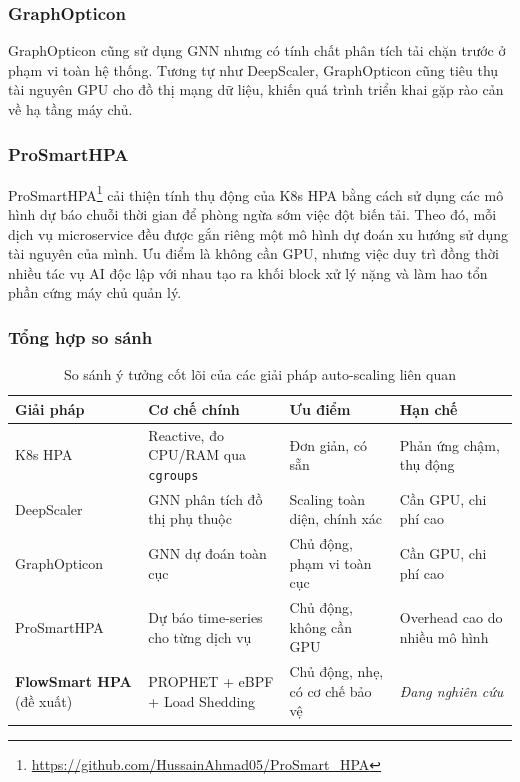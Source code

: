 \documentclass[14pt]{article}
\begin{document}
\subsubsection{GraphOpticon}

GraphOpticon \cite{theodoropoulos2026graphopticon} cũng sử dụng GNN nhưng có tính chất phân tích tải chặn trước ở phạm vi toàn hệ thống. Tương tự như DeepScaler, GraphOpticon cũng tiêu thụ tài nguyên GPU cho đồ thị mạng dữ liệu, khiến quá trình triển khai gặp rào cản về hạ tầng máy chủ.

\subsubsection{ProSmartHPA}

ProSmartHPA\footnote{\url{https://github.com/HussainAhmad05/ProSmart_HPA}} \cite{ahmad2025towards} cải thiện tính thụ động của K8s HPA bằng cách sử dụng các mô hình dự báo chuỗi thời gian để phòng ngừa sớm việc đột biến tải. Theo đó, mỗi dịch vụ microservice đều được gắn riêng một mô hình dự đoán xu hướng sử dụng tài nguyên của mình. Ưu điểm là không cần GPU, nhưng việc duy trì đồng thời nhiều tác vụ AI độc lập với nhau tạo ra khối block xử lý nặng và làm hao tổn phần cứng máy chủ quản lý.

\subsubsection{Tổng hợp so sánh}

\begin{table}[H]
\centering
\caption{So sánh ý tưởng cốt lõi của các giải pháp auto-scaling liên quan}
\renewcommand{\arraystretch}{1.3}
\begin{tabular}{|>{\raggedright\arraybackslash}p{2.8cm}|>{\raggedright\arraybackslash}p{3.2cm}|>{\raggedright\arraybackslash}p{3.5cm}|>{\raggedright\arraybackslash}p{4cm}|}
\hline
\textbf{Giải pháp} & \textbf{Cơ chế chính} & \textbf{Ưu điểm} & \textbf{Hạn chế} \\ \hline
K8s HPA & Reactive, đo CPU/RAM qua \texttt{cgroups} & Đơn giản, có sẵn & Phản ứng chậm, thụ động \\ \hline
DeepScaler & GNN phân tích đồ thị phụ thuộc & Scaling toàn diện, chính xác & Cần GPU, chi phí cao \\ \hline
GraphOpticon & GNN dự đoán toàn cục & Chủ động, phạm vi toàn cục & Cần GPU, chi phí cao \\ \hline
ProSmartHPA & Dự báo time-series cho từng dịch vụ & Chủ động, không cần GPU & Overhead cao do nhiều mô hình \\ \hline
\textbf{FlowSmart HPA} (đề xuất) & PROPHET + eBPF + Load Shedding & Chủ động, nhẹ, có cơ chế bảo vệ & \textit{Đang nghiên cứu} \\ \hline
\end{tabular}
\end{table}
\end{document}
